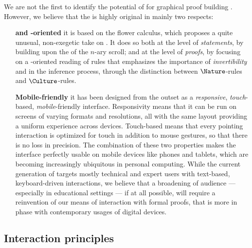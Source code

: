 We are not the first to identify the potential of  for graphical proof
building . However, we believe that the
 is highly original in mainly two respects:
\begin{itemize}
  \item[\textbf{\kl{Intuitionistic} and \kl{goal}-oriented}] it is based on the flower
  calculus, which proposes a quite unusual, non-exegetic take on . It does so
  both at the level of \emph{statements}, by building upon the 
   of the $n$-ary scroll; and at the level of \emph{proofs}, by focusing on
  a -oriented reading of rules that emphasizes the importance of
  \emph{invertibility} and \emph{} in the inference process, through
  the distinction between $\Nature$-rules and $\Culture$-rules.
  \item[\textbf{Mobile-friendly}] it has been designed from the outset as a
  \emph{responsive}, \emph{touch}-based, \emph{mobile}-friendly interface.
  Responsivity means that it can be run on screens of varying formats and
  resolutions, all with the same layout providing a uniform experience across
  devices. Touch-based means that every pointing interaction is optimized for
  touch in addition to mouse gestures, so that there is no loss in precision.
  The combination of these two properties makes the interface perfectly usable
  on mobile devices like phones and tablets, which are becoming increasingly
  ubiquitous in personal computing. While the current generation of  targets mostly technical and expert users with text-based,
  keyboard-driven interactions, we believe that a broadening of audience ---
  especially in educational settings --- if at all possible, will require a
  reinvention of our means of interaction with formal proofs, that is more in
  phase with contemporary usages of digital devices.
\end{itemize}

\subsection{Interaction principles}

